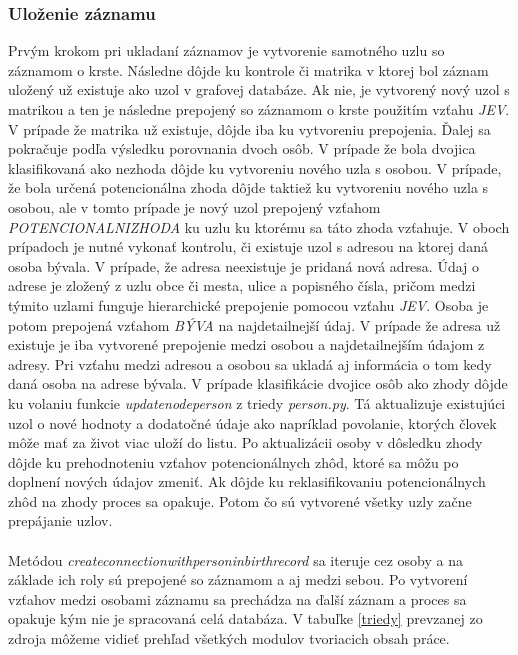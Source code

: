 \subsubsection{Uloženie záznamu}
Prvým krokom pri ukladaní záznamov je vytvorenie samotného uzlu so záznamom o krste.
Následne dôjde ku kontrole či matrika v ktorej bol záznam uložený už existuje ako uzol
v grafovej databáze. Ak nie, je vytvorený nový uzol s matrikou a ten je následne prepojený so
záznamom o krste použitím vzťahu \textit{JE\textunderscore V}. V prípade že matrika už existuje, dôjde iba ku
vytvoreniu prepojenia. Ďalej sa pokračuje podľa výsledku porovnania dvoch osôb.
V prípade že bola dvojica klasifikovaná ako nezhoda dôjde ku vytvoreniu nového uzla
s osobou. V prípade, že bola určená potencionálna zhoda dôjde taktiež ku vytvoreniu nového
uzla s osobou, ale v tomto prípade je nový uzol prepojený vzťahom \textit{POTENCIONALNI\textunderscore ZHODA} ku uzlu ku ktorému sa táto zhoda vzťahuje. V oboch prípadoch je
nutné vykonať kontrolu, či existuje uzol s adresou na ktorej daná osoba bývala. V prípade, že
adresa neexistuje je pridaná nová adresa. Údaj o adrese je zložený z uzlu obce či mesta,
ulice a popisného čísla, pričom medzi týmito uzlami funguje hierarchické prepojenie
pomocou vzťahu \textit{JE\textunderscore V}. Osoba je potom prepojená vzťahom \textit{BÝVA} na najdetailnejší údaj.
V prípade že adresa už existuje je iba vytvorené prepojenie medzi osobou a najdetailnejším
údajom z adresy. Pri vzťahu medzi adresou a osobou sa ukladá aj informácia o tom kedy
daná osoba na adrese bývala. V prípade klasifikácie dvojice osôb ako zhody dôjde ku
volaniu funkcie \textit{update\textunderscore node\textunderscore person} z triedy \textit{person.py}. Tá aktualizuje existujúci uzol o nové
hodnoty a dodatočné údaje ako napríklad povolanie, ktorých človek môže mať za život viac
uloží do listu. Po aktualizácii osoby v dôsledku zhody dôjde ku prehodnoteniu vzťahov
potencionálnych zhôd, ktoré sa môžu po doplnení nových údajov zmeniť. Ak dôjde ku
reklasifikovaniu potencionálnych zhôd na zhody proces sa opakuje. Potom čo sú vytvorené
všetky uzly začne prepájanie uzlov.\\\\
Metódou \textit{create\textunderscore connection\textunderscore with\textunderscore person\textunderscore in\textunderscore birth\textunderscore record} sa iteruje cez osoby a na základe
ich roly sú prepojené so záznamom a aj medzi sebou. Po vytvorení vzťahov medzi osobami
záznamu sa prechádza na ďalší záznam a proces sa opakuje kým nie je spracovaná celá
databáza. V tabuľke \ref{triedy} prevzanej zo zdroja \cite{formalniDP} môžeme vidieť prehľad všetkých modulov tvoriacich obsah práce.
\newpage

